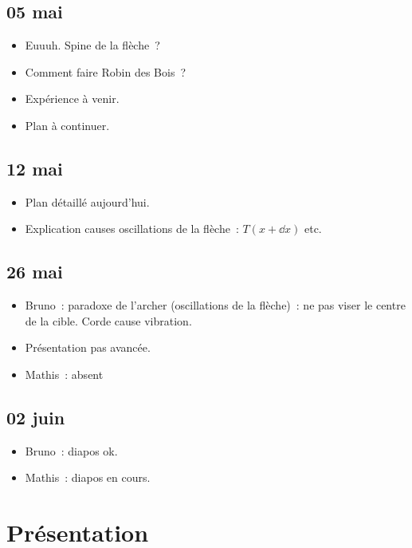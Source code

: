 \documentclass[a4paper, 11pt, final, garamond]{book}
\begin{document}
\subsection{05 mai}
\begin{itemize}
  \item Euuuh. Spine de la flèche~?
  \item Comment faire Robin des Bois~?
  \item Expérience à venir.
  \item Plan à continuer.
\end{itemize}

\subsection{12 mai}
\begin{itemize}
  \item Plan détaillé aujourd'hui.
  \item Explication causes oscillations de la flèche~: $T(x+\dd x)$ etc.
\end{itemize}

\subsection{26 mai}
\begin{itemize}
  \item Bruno~: paradoxe de l'archer (oscillations de la flèche)~: ne pas viser
    le centre de la cible. Corde cause vibration.
  \item Présentation pas avancée.
  \item Mathis~: absent
\end{itemize}

\subsection{02 juin}
\begin{itemize}
  \item Bruno~: diapos ok.
  \item Mathis~: diapos en cours.
\end{itemize}

\section{Présentation}
\end{document}
